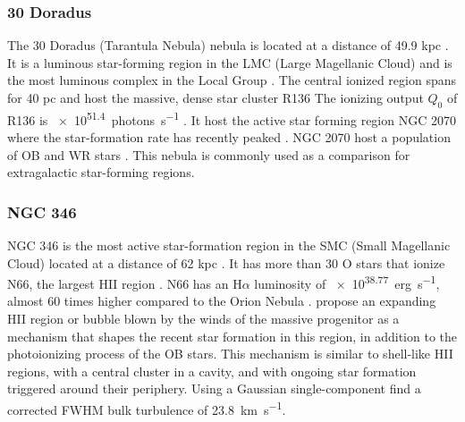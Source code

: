 \documentclass[fleqn,usenatbib, useAMS, a4paper]{mnras}
\newcommand\ha{\ensuremath{\text{H}\alpha}}
\begin{document}
\subsubsection{30 Doradus}
\label{sec:30-doradus}

The 30 Doradus (Tarantula Nebula) nebula is located at a distance of 49.9 kpc \citetext{\SI{1}{\arcsecond} = \SI{0.24}{pc} ; \citealp{2013Natur.495...76P}}.
It is a luminous star-forming region in the LMC (Large Magellanic Cloud) and is the most luminous complex in the Local Group \citep{1984ApJ...287..116K}.
The central ionized region spans for 40 pc and host the massive, dense star cluster R136 %
The ionizing output \(Q_0\) of R136 is \SI{e51.4}{photons.s^{-1}} \citep{2020MNRAS.499.1918B}.
It host the active star forming region NGC 2070 \citep{2013AJ....145...98W} where the star-formation rate has recently peaked \citep{2015ApJ...811...76C}. 
NGC 2070 host a population of OB and WR stars \citep{2011A&A...530A.108E}.
This nebula is commonly used as a comparison for extragalactic star-forming regions.

\subsubsection{NGC 346}
\label{sec:ngc-346}

NGC 346 is the most active star-formation region in the SMC (Small Magellanic Cloud) located at a distance of 62 kpc \citetext{\SI{1}{\arcsecond} = \SI{0.30}{pc} ; \citealp{2001ApJ...562..303D}}. 
It has more than 30 O stars that ionize N66, the largest HII region \citep{2011ApJ...740...10D}.
N66 has an \ha{} luminosity of \SI{e38.77}{erg.s^{-1}}, almost 60 times higher compared to the Orion Nebula \citep{2010A&A...517A..39H,1984ApJ...287..116K}.
\citet{2008ApJ...688.1050G} propose an expanding HII region or bubble blown by the winds of the massive progenitor as a mechanism that shapes the recent star formation in this region, in addition to the photoionizing process of the OB stars. 
This mechanism is similar to shell-like HII regions, with a central cluster in a cavity, and with ongoing star formation triggered around their periphery.
Using a Gaussian single-component \citet{2003ApJ...586.1179D} find a corrected FWHM bulk turbulence of \SI{23.8}{km.s^{-1}}. 
\end{document}
